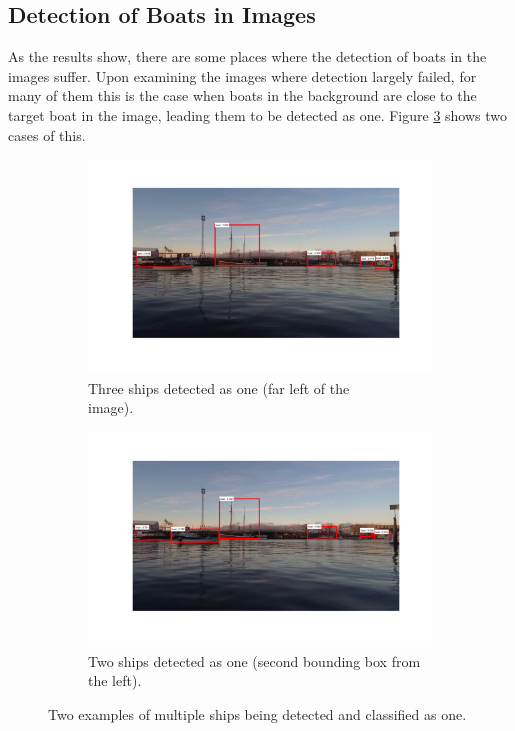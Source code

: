 \subsection{Detection of Boats in Images}
As the results show, there are some places where the detection of boats in the images suffer. Upon examining the images where detection largely failed, for many of them this is the case when boats in the background are close to the target boat in the image, leading them to be detected as one. Figure \ref{fig:issues_multiple_detections} shows two cases of this. 
\begin{figure}[H]
	\centering
	\begin{subfigure}[t]{.5\textwidth}
		\centering
		\includegraphics[width=\linewidth]{fig/issue_overlapping.png}
		\caption{Three ships detected as one (far left of the\\ image).}
		\label{fig:sub_issue1}
	\end{subfigure}%
	\begin{subfigure}[t]{.5\textwidth}
		\centering
		\includegraphics[width=\linewidth]{fig/issue_2.png}
		\caption{Two ships detected as one (second bounding box from the left).}
		\label{fig:sub_issue2}
	\end{subfigure}
	\caption{Two examples of multiple ships being detected and classified as one.}
	\label{fig:issues_multiple_detections}
\end{figure}
